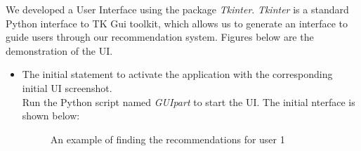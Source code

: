 
We developed a User Interface using the package \textit{Tkinter}.  \textit{Tkinter} is a standard Python interface to TK Gui toolkit, which allows us to generate an interface  to guide users through our recommendation system.  Figures below are the demonstration of the UI.
\begin{itemize} 
\item{The initial statement to activate the application with the corresponding initial UI screenshot.}
\\Run the Python script named \textit{GUIpart} to start the UI. The initial nterface is shown below:
\begin{figure}[h] 
	\begin{center}
		\advance\rightskip-1cm
		{}
		\caption{An example of finding the recommendations for user 1}\label{fig:UI_input}
	\end{center}
\end{figure}




\end{itemize}
